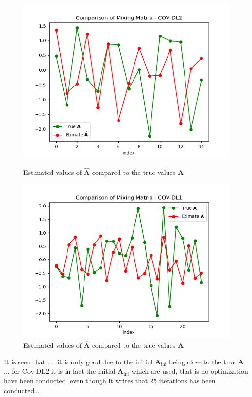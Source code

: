 \begin{figure}[H]
    \begin{minipage}[t]{.45\textwidth}
    	\centering
		\includegraphics[scale=0.5]{figures/ch_6/COV2_simple.png}
		\caption{Estimated values of $\hat{\textbf{A}}$ compared to the true 					values $\textbf{A}$}
		\label{fig:cov2_simple}
    \end{minipage} 
    \hfill
    \begin{minipage}[t]{.45\textwidth}
        \centering
		\includegraphics[scale=0.5]{figures/ch_6/COV1_simple.png}
		\caption{Estimated values of $\hat{\textbf{A}}$ compared to the true 				values $\textbf{A}$}
		\label{fig:cov1_simple}
    \end{minipage}
\end{figure}
It is seen that .... it is only good due to the initial $\textbf{A}_{\text{ini}}$ being close to the true $\textbf{A}$... for Cov-DL2 it is in fact the initial $\textbf{A}_{\text{ini}}$ which are used, that is no optimization have been conducted, even though it writes that 25 iterations has been conducted... 


